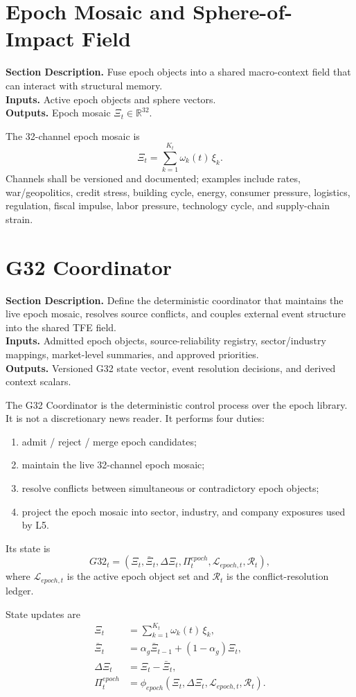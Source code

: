 \documentclass[11pt]{report}
\newcommand{\meta}[3]{\textbf{Section Description.} #1\\
\textbf{Inputs.} #2\\
\textbf{Outputs.} #3\par}
\begin{document}
\section{Epoch Mosaic and Sphere-of-Impact Field}
\meta{Fuse epoch objects into a shared macro-context field that can interact with structural memory.}{Active epoch objects and sphere vectors.}{Epoch mosaic $\Xi_t \in \mathbb{R}^{32}$.}

The 32-channel epoch mosaic is
\[
\Xi_t = \sum_{k=1}^{K_t} \omega_k(t)\,\xi_k.
\]
Channels shall be versioned and documented; examples include rates, war/geopolitics, credit stress, building cycle, energy, consumer pressure, logistics, regulation, fiscal impulse, labor pressure, technology cycle, and supply-chain strain.

\section{G32 Coordinator}
\meta{Define the deterministic coordinator that maintains the live epoch mosaic, resolves source conflicts, and couples external event structure into the shared TFE field.}{Admitted epoch objects, source-reliability registry, sector/industry mappings, market-level summaries, and approved priorities.}{Versioned G32 state vector, event resolution decisions, and derived context scalars.}

The G32 Coordinator is the deterministic control process over the epoch library. It is not a discretionary news reader. It performs four duties:
\begin{enumerate}[leftmargin=1.2cm]
    \item admit / reject / merge epoch candidates;
    \item maintain the live 32-channel epoch mosaic;
    \item resolve conflicts between simultaneous or contradictory epoch objects;
    \item project the epoch mosaic into sector, industry, and company exposures used by L5.
\end{enumerate}

Its state is
\[
G32_t=(\Xi_t,\bar\Xi_t,\Delta\Xi_t,\Pi_t^{epoch},\mathcal{L}_{epoch,t},\mathcal{R}_t),
\]
where $\mathcal{L}_{epoch,t}$ is the active epoch object set and $\mathcal{R}_t$ is the conflict-resolution ledger.

State updates are
\begin{align*}
\Xi_t &= \sum_{k=1}^{K_t} \omega_k(t)\,\xi_k,\\
\bar \Xi_t &= \alpha_g \bar \Xi_{t-1} + (1-\alpha_g)\Xi_t,\\
\Delta \Xi_t &= \Xi_t-\bar \Xi_t,\\
\Pi_t^{epoch} &= \phi_{epoch}\!\left(\Xi_t,\Delta\Xi_t,\mathcal{L}_{epoch,t},\mathcal{R}_t\right).
\end{align*}
\end{document}
